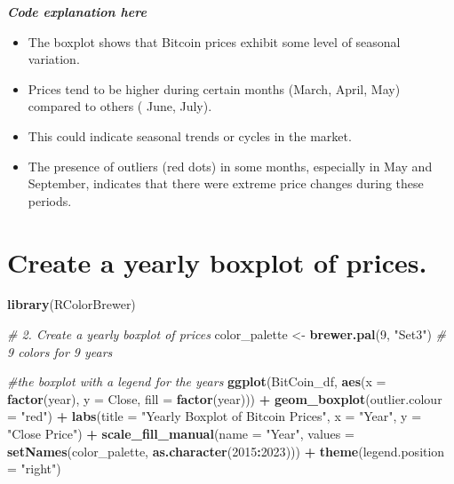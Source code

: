 \documentclass[
]{book}
\newenvironment{Shaded}{\begin{snugshade}}{\end{snugshade}}
\newcommand{\AttributeTok}[1]{\textcolor[rgb]{0.13,0.29,0.53}{#1}}
\newcommand{\CommentTok}[1]{\textcolor[rgb]{0.56,0.35,0.01}{\textit{#1}}}
\newcommand{\DecValTok}[1]{\textcolor[rgb]{0.00,0.00,0.81}{#1}}
\newcommand{\FunctionTok}[1]{\textcolor[rgb]{0.13,0.29,0.53}{\textbf{#1}}}
\newcommand{\NormalTok}[1]{#1}
\newcommand{\OtherTok}[1]{\textcolor[rgb]{0.56,0.35,0.01}{#1}}
\newcommand{\SpecialCharTok}[1]{\textcolor[rgb]{0.81,0.36,0.00}{\textbf{#1}}}
\newcommand{\StringTok}[1]{\textcolor[rgb]{0.31,0.60,0.02}{#1}}
\providecommand{\tightlist}{%
  \setlength{\itemsep}{0pt}\setlength{\parskip}{0pt}}
\begin{document}
\emph{\textbf{Code explanation here}}

\begin{itemize}
\tightlist
\item
  The boxplot shows that Bitcoin prices exhibit some level of seasonal variation.
\item
  Prices tend to be higher during certain months (March, April, May) compared to others ( June, July).
\item
  This could indicate seasonal trends or cycles in the market.
\item
  The presence of outliers (red dots) in some months, especially in May and September, indicates that there were extreme price changes during these periods.
\end{itemize}

\section*{Create a yearly boxplot of prices.}\label{create-a-yearly-boxplot-of-prices.}

\begin{Shaded}
\begin{Highlighting}[]
\FunctionTok{library}\NormalTok{(RColorBrewer)}

\CommentTok{\# 2. Create a yearly boxplot of prices}
\NormalTok{color\_palette }\OtherTok{\textless{}{-}} \FunctionTok{brewer.pal}\NormalTok{(}\DecValTok{9}\NormalTok{, }\StringTok{"Set3"}\NormalTok{)  }\CommentTok{\# 9 colors for 9 years}

\CommentTok{\#the boxplot with a legend for the years}
\FunctionTok{ggplot}\NormalTok{(BitCoin\_df, }\FunctionTok{aes}\NormalTok{(}\AttributeTok{x =} \FunctionTok{factor}\NormalTok{(year), }\AttributeTok{y =}\NormalTok{ Close, }\AttributeTok{fill =} \FunctionTok{factor}\NormalTok{(year))) }\SpecialCharTok{+}
  \FunctionTok{geom\_boxplot}\NormalTok{(}\AttributeTok{outlier.colour =} \StringTok{"red"}\NormalTok{) }\SpecialCharTok{+}
  \FunctionTok{labs}\NormalTok{(}\AttributeTok{title =} \StringTok{"Yearly Boxplot of Bitcoin Prices"}\NormalTok{, }\AttributeTok{x =} \StringTok{"Year"}\NormalTok{, }\AttributeTok{y =} \StringTok{"Close Price"}\NormalTok{) }\SpecialCharTok{+}
  \FunctionTok{scale\_fill\_manual}\NormalTok{(}\AttributeTok{name =} \StringTok{"Year"}\NormalTok{, }\AttributeTok{values =} \FunctionTok{setNames}\NormalTok{(color\_palette, }\FunctionTok{as.character}\NormalTok{(}\DecValTok{2015}\SpecialCharTok{:}\DecValTok{2023}\NormalTok{))) }\SpecialCharTok{+}
  \FunctionTok{theme}\NormalTok{(}\AttributeTok{legend.position =} \StringTok{"right"}\NormalTok{)}
\end{Highlighting}
\end{Shaded}
\end{document}
